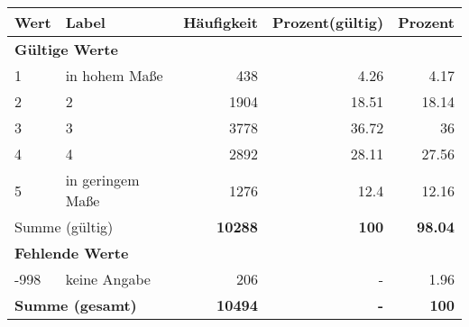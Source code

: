      \begin{longtable}{lXrrr}
     \toprule
     \textbf{Wert} & \textbf{Label} & \textbf{Häufigkeit} & \textbf{Prozent(gültig)} & \textbf{Prozent} \\
     \endhead
     \midrule
     \multicolumn{5}{l}{\textbf{Gültige Werte}}\\

     1 &
     \multicolumn{1}{X}{ in hohem Maße   } &


       \num{438} &
       \num[round-mode=places,round-precision=2]{4.26} &
         \num[round-mode=places,round-precision=2]{4.17} \\

     2 &
     \multicolumn{1}{X}{ 2   } &


       \num{1904} &
       \num[round-mode=places,round-precision=2]{18.51} &
         \num[round-mode=places,round-precision=2]{18.14} \\

     3 &
     \multicolumn{1}{X}{ 3   } &


       \num{3778} &
       \num[round-mode=places,round-precision=2]{36.72} &
         \num[round-mode=places,round-precision=2]{36} \\

     4 &
     \multicolumn{1}{X}{ 4   } &


       \num{2892} &
       \num[round-mode=places,round-precision=2]{28.11} &
         \num[round-mode=places,round-precision=2]{27.56} \\

     5 &
     \multicolumn{1}{X}{ in geringem Maße   } &


       \num{1276} &
       \num[round-mode=places,round-precision=2]{12.4} &
         \num[round-mode=places,round-precision=2]{12.16} \\
     \midrule
     \multicolumn{2}{l}{Summe (gültig)} &
       \textbf{\num{10288}} &
     \textbf{\num{100}} &
       \textbf{\num[round-mode=places,round-precision=2]{98.04}} \\
     \multicolumn{5}{l}{\textbf{Fehlende Werte}}\\
       -998 &
       keine Angabe &
         \num{206} &
        - &
         \num[round-mode=places,round-precision=2]{1.96} \\
     \midrule
     \multicolumn{2}{l}{\textbf{Summe (gesamt)}} &
          \textbf{\num{10494}} &
        \textbf{-} &
        \textbf{\num{100}} \\
     \bottomrule
     \end{longtable}
     
